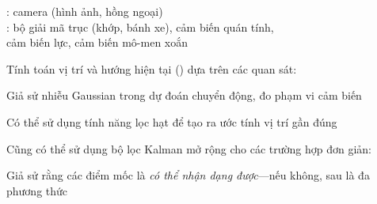\documentclass{article}
\begin{document}
\begin{huge}
\centerline{  \qquad {} }

: camera (hình ảnh, hồng ngoại)\\
: bộ giải mã trục (khớp, bánh xe), cảm biến quán tính, \\
cảm biến lực, cảm biến mô-men xoắn



Tính toán vị trí và hướng hiện tại () dựa trên các quan sát:

\vspace*{0.2in}

\textwidth
{}


\vspace*{0.2in}


Giả sử nhiễu Gaussian trong dự đoán chuyển động, đo phạm vi cảm biến


Có thể sử dụng tính năng lọc hạt để tạo ra ước tính vị trí gần đúng

\vspace*{0.2in}



Cũng có thể sử dụng bộ lọc Kalman mở rộng  cho các trường hợp đơn giản:

\vspace*{0.2in}

\textwidth
{}

Giả sử rằng các điểm mốc là {\em có thể nhận dạng được}---nếu không,
sau là đa phương thức







\end{huge}
\end{document}
